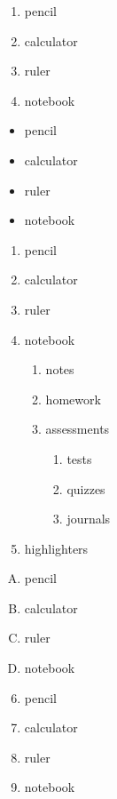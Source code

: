 \documentclass[11pt]{article}
\begin{document}
\begin{enumerate}
\item pencil
\item calculator
\item ruler
\item notebook
\end{enumerate}

\begin{itemize}
\item pencil
\item calculator
\item ruler
\item notebook
\end{itemize}


\begin{enumerate}
\item pencil
\item calculator
\item ruler
\item notebook
	
	\begin{enumerate}
	\item notes
	\item homework
	\item assessments
		
		\begin{enumerate}
		\item tests
		\item quizzes
		\item journals
		\end{enumerate}			
	\end{enumerate}
\item highlighters
\end{enumerate}

\vspace{1cm}

\begin{enumerate}[A.]
\item pencil
\item calculator
\item ruler
\item notebook
\end{enumerate}

\vspace{1cm}

\begin{enumerate}\setcounter{enumi}{5}
\item pencil
\item calculator
\item ruler
\item notebook
\end{enumerate}
\end{document}
